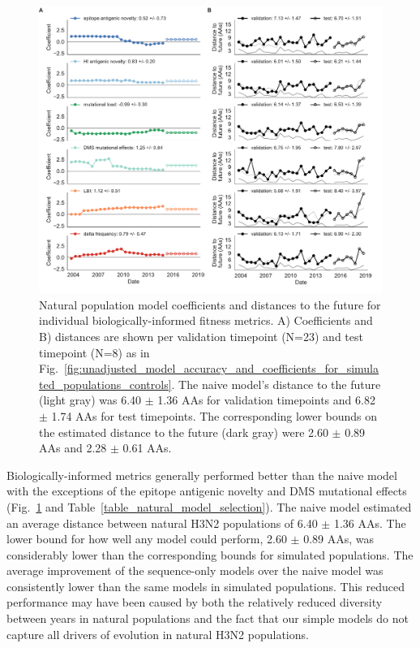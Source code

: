 \begin{figure}[htb]
  \begin{center}
  \includegraphics[width=\textwidth]{figures/unadjusted-model-accuracy-and-coefficients-for-natural-populations.pdf}
  \caption{
    Natural population model coefficients and distances to the future for individual biologically-informed fitness metrics.
    A) Coefficients and B) distances are shown per validation timepoint (N=23) and test timepoint (N=8) as in Fig.~\ref{fig:unadjusted_model_accuracy_and_coefficients_for_simulated_populations_controls}.
    The naive model's distance to the future (light gray) was 6.40 $\pm$ 1.36 AAs for validation timepoints and 6.82 $\pm$ 1.74 AAs for test timepoints.
    The corresponding lower bounds on the estimated distance to the future (dark gray) were 2.60 $\pm$ 0.89 AAs and 2.28 $\pm$ 0.61 AAs.
  }
  \label{fig:unadjusted_model_accuracy_and_coefficients_for_natural_populations}
  \end{center}
\end{figure}

Biologically-informed metrics generally performed better than the naive model with the exceptions of the epitope antigenic novelty and DMS mutational effects (Fig.~\ref{fig:unadjusted_model_accuracy_and_coefficients_for_natural_populations} and Table~\ref{table_natural_model_selection}).
The naive model estimated an average distance between natural H3N2 populations of 6.40 $\pm$ 1.36 AAs.
The lower bound for how well any model could perform, 2.60 $\pm$ 0.89 AAs, was considerably lower than the corresponding bounds for simulated populations.
The average improvement of the sequence-only models over the naive model was consistently lower than the same models in simulated populations.
This reduced performance may have been caused by both the relatively reduced diversity between years in natural populations and the fact that our simple models do not capture all drivers of evolution in natural H3N2 populations.

